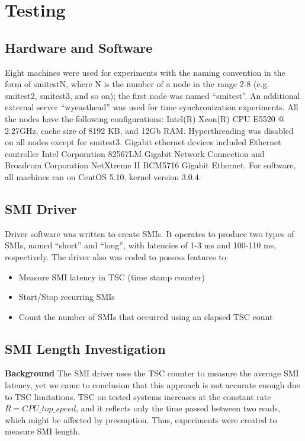 \documentclass{IEEEtran}
\begin{document}
\section{Testing}\label{sec:testing}
\subsection{Hardware and Software}\label{sub:hardware_and_software}
Eight machines were used for experiments with the naming convention in the form of smitestN, where N is the number of a node in the range 2-8 (e.g. smitest2, smitest3, and so on); the first node was named ``smitest''. An additional external server ``wyeasthead'' was used for time synchronization experiments. All the nodes have the following configurations: Intel(R) Xeon(R) CPU E5520  @ 2.27GHz, cache size of 8192 KB, and 12Gb RAM. Hyperthreading was disabled on all nodes except for smitest3. Gigabit ethernet devices included Ethernet controller Intel Corporation 82567LM Gigabit Network Connection and Broadcom Corporation NetXtreme II BCM5716 Gigabit Ethernet. For software, all machines ran on CentOS 5.10, kernel version 3.0.4.

\subsection{SMI Driver}\label{sub:smi_driver}
Driver software was written to create SMIs. It operates to produce two types of SMIs, named ``short'' and ``long'', with latencies of 1-3 ms and 100-110 ms, respectively. The driver also was coded to possess features to:
\begin{itemize}
  \item Measure SMI latency in TSC (time stamp counter)
  \item Start/Stop recurring SMIs
  \item Count the number of SMIs that occurred using an elapsed TSC count
\end{itemize}

\subsection{SMI Length Investigation}\label{sub:km_smilength}

\textbf{Background}
The SMI driver uses the TSC counter to measure the average SMI latency, yet we came to conclusion that this approach is not accurate enough due to TSC limitations. TSC on tested systems increases at the constant rate $R=CPU\_top\_speed$, and it reflects only the time passed between two reads, which might be affected by preemption. Thus, experiments were created to measure SMI length.
\end{document}
